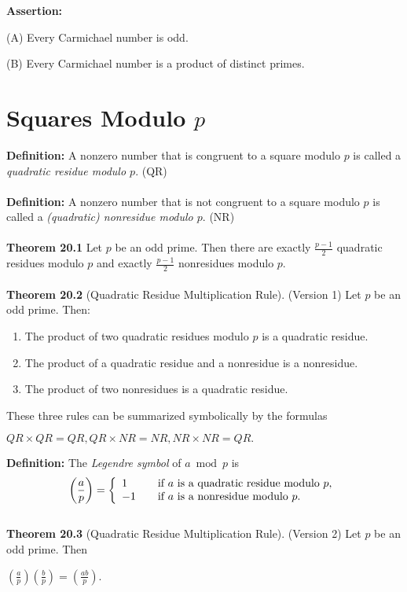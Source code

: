 \documentclass{article}
\begin{document}
\textbf{Assertion:}

(A) Every Carmichael number is odd.

(B) Every Carmichael number is a product of distinct primes.

\section{Squares Modulo $p$}
\textbf{Definition:} A nonzero number that is congruent to a square modulo $p$ is called a \textit{quadratic residue modulo $p$}. (QR) \\\\
\textbf{Definition:} A nonzero number that is not congruent to a square modulo $p$ is called a \textit{(quadratic) nonresidue modulo $p$}. (NR) \\\\
\textbf{Theorem 20.1} Let $p$ be an odd prime. Then there are exactly $\frac{p-1}{2}$ quadratic residues modulo $p$ and exactly $\frac{p-1}{2}$ nonresidues modulo $p$.\\\\
\textbf{Theorem 20.2} (Quadratic Residue Multiplication Rule). (Version 1) Let $p$ be an odd prime. Then:
\begin{center}
\begin{enumerate}
\item The product of two quadratic residues modulo $p$ is a quadratic residue.
\item The product of a quadratic residue and a nonresidue is a nonresidue.
\item The product of two nonresidues is a quadratic residue.
\end{enumerate}
\end{center}
These three rules can be summarized symbolically by the formulas
\begin{center}
$QR \times QR =QR, QR \times NR=NR, NR\times NR= QR.$
\end{center}
\textbf{Definition:} The \textit{Legendre symbol} of $a \bmod p$ is
\[ \left(\frac{a}{p}\right)= \left\{
    \begin{array}{l l}
    1 & \quad \text{if $a$ is a quadratic residue modulo $p$,}\\
    -1 & \quad \text{if $a$ is a nonresidue modulo $p$.}
    \end{array} \right.\]\\
\textbf{Theorem 20.3} (Quadratic Residue Multiplication Rule). (Version 2) Let $p$ be an odd prime. Then
\begin{center}
$\left(\frac{a}{p}\right)\left(\frac{b}{p}\right)=\left(\frac{ab}{p}\right)$.
\end{center}
\end{document}
